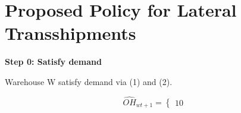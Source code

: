 \documentclass[../../main.tex]{subfiles}
\begin{document}



\section{Proposed Policy for Lateral Transshipments}

\textbf{Step 0: Satisfy demand}

Warehouse W satisfy demand via (1) and (2).

\[
\hat{OH}_{wt+1} =
\begin{cases}
1
0
\end{cases}

\]




\end{document}
